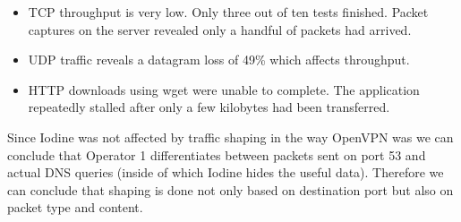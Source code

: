 \begin{itemize}
\item TCP throughput is very low. Only three out of ten tests finished. Packet captures on the server revealed only a handful of packets had arrived.
\item UDP traffic reveals a datagram loss of 49\% which affects throughput.
\item HTTP downloads using wget were unable to complete. The application repeatedly stalled after only a few kilobytes had been transferred.
\end{itemize}

Since Iodine was not affected by traffic shaping in the way OpenVPN was we can
conclude that Operator 1 differentiates between packets sent on port 53 and
actual DNS queries (inside of which Iodine hides the useful data). Therefore we can conclude that shaping is done not only based on destination port but also on packet type and content.
